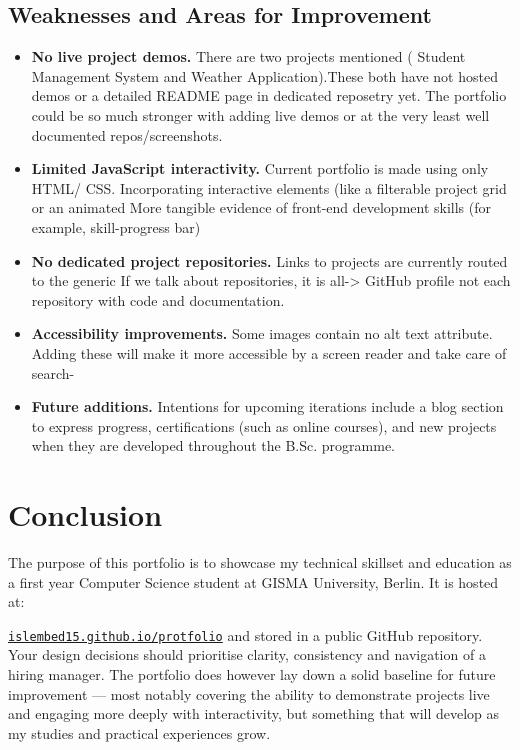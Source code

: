 \documentclass[12pt,a4paper]{article}
\begin{document}
\subsection{Weaknesses and Areas for Improvement}
\begin{itemize}
    \item \textbf{No live project demos.} There are two projects mentioned
    ( Student Management System and Weather Application).These both have not hosted demos or a detailed README page in dedicated reposetry yet. 
    The portfolio could be so much stronger with adding live demos or at the very least well documented repos/screenshots.
    \item \textbf{Limited JavaScript interactivity.} Current portfolio is made using only HTML/ CSS. Incorporating interactive elements (like a filterable project grid or an animated More tangible evidence of front-end development skills (for example, skill-progress bar)
    \item \textbf{No dedicated project repositories.} Links to projects are currently routed to the generic If we talk about repositories, it is all-> GitHub profile not each repository with code and documentation.
    \item \textbf{Accessibility improvements.} Some images contain no alt text attribute. Adding these will make it more accessible by a screen reader and take care of search-
    \item \textbf{Future additions.} Intentions for upcoming iterations include a blog section to express progress, certifications (such as online courses), and new projects when they are developed throughout the B.Sc. programme.
\end{itemize}

\section{Conclusion}

The purpose of this portfolio is to showcase my technical skillset and education as a first year Computer Science student at GISMA University, Berlin. It is hosted at:

\href{https://islembed15.github.io/protfolio/}{\texttt{islembed15.github.io/protfolio}}
and stored in a public GitHub repository. Your design decisions should prioritise clarity, consistency and navigation of a hiring manager. The portfolio does however lay down a solid baseline for future improvement — most notably covering the ability to demonstrate projects live and engaging more deeply with interactivity, but something that will develop as my studies and practical experiences grow.
\end{document}

